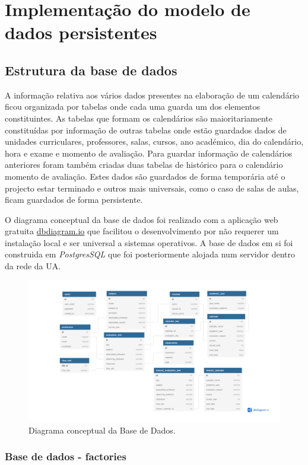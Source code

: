 \documentclass[11pt, twoside]{report}
\begin{document}
	\chapter{Implementação do modelo de dados persistentes}
	\section{Estrutura da base de dados}
	A informação relativa aos vários dados presentes na elaboração de um calendário ficou organizada por tabelas onde cada uma guarda um dos elementos constituintes.
	As tabelas que formam os calendários são maioritariamente constituídas por informação de outras tabelas onde estão guardados dados de unidades curriculares, professores, salas, cursos, ano académico, dia do calendário, hora e exame e momento de avaliação.
	Para guardar informação de calendários anteriores foram também criadas duas tabelas de histórico para o calendário momento de avaliação.
	Estes dados são guardados de forma temporária até o projecto estar terminado e outros mais universais, como o caso de salas de aulas, ficam guardados de forma persistente.
	
	O diagrama conceptual da base de dados foi realizado com a aplicação web gratuita \href{https://dbdiagram.io/}{dbdiagram.io} que facilitou o desenvolvimento por não requerer um instalação local e ser universal a sistemas operativos.
	A base de dados em si foi construida em \textit{PostgresSQL} que foi posteriormente alojada num servidor dentro da rede da UA.
	
	\begin{figure}[H]
		\centering
		\includegraphics[width=0.95\linewidth]{image/Calendario_DB}
		\caption{Diagrama conceptual da Base de Dados.}
		\label{fig:calendariodb}
	\end{figure}
	
	
	\subsection{Base de dados - factories}
\end{document}
